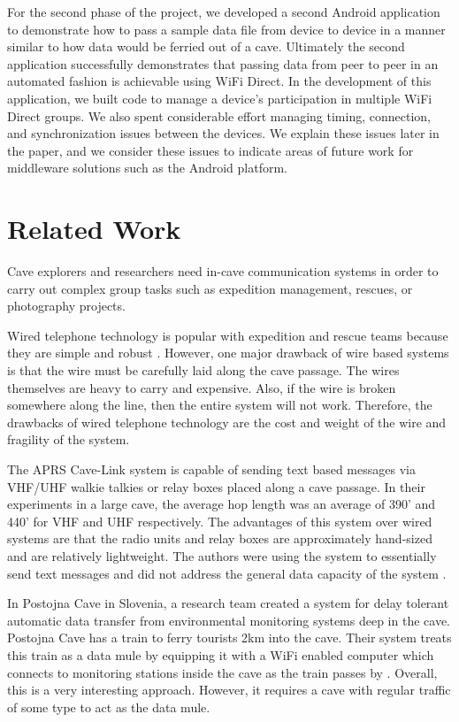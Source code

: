 \documentclass[10pt,twocolumn]{article}
\begin{document}
For the second phase of the project, we developed a second Android application to demonstrate how to pass a sample data file from device to device in a manner similar to how data would be ferried out of a cave.
Ultimately the second application successfully demonstrates that passing data from peer to peer in an automated fashion is achievable using WiFi Direct. 
In the development of this application, we built code to manage a device's participation in multiple WiFi Direct groups.
We also spent considerable effort managing timing, connection, and synchronization issues between the devices.
We explain these issues later in the paper, and we consider these issues to indicate areas of future work for middleware solutions
such as the Android platform.

\section{Related Work}
\label{sec:Related}
Cave explorers and researchers need in-cave communication systems in order to carry out complex group tasks such as expedition management, rescues, or photography projects.

Wired telephone technology is popular with expedition and rescue teams because they are simple and robust \cite{cavecomm}.
However, one major drawback of wire based systems is that the wire must be carefully laid along the cave passage. 
The wires themselves are heavy to carry and expensive.
Also, if the wire is broken somewhere along the line, then the entire system will not work.
Therefore, the drawbacks of wired telephone technology are the cost and weight of the wire and fragility of the system.

The APRS Cave-Link system is capable of sending text based messages via VHF/UHF walkie talkies or relay boxes placed along a cave passage.
In their experiments in a large cave, the average hop length was an average of 390' and 440' for VHF and UHF respectively.
The advantages of this system over wired systems are that the radio units and relay boxes are approximately hand-sized and are relatively lightweight.
The authors were using the system to essentially send text messages and did not address the general data capacity of the system \cite{cavelink}.

In Postojna Cave in Slovenia, a research team created a system for delay tolerant automatic data transfer from environmental monitoring systems deep in the cave.
Postojna Cave has a train to ferry tourists 2km into the cave.
Their system treats this train as a data mule by equipping it with a WiFi enabled computer which connects to monitoring stations inside the cave as the train passes by \cite{postojna2014}.
Overall, this is a very interesting approach. 
However, it requires a cave with regular traffic of some type to act as the data mule.
\end{document}
